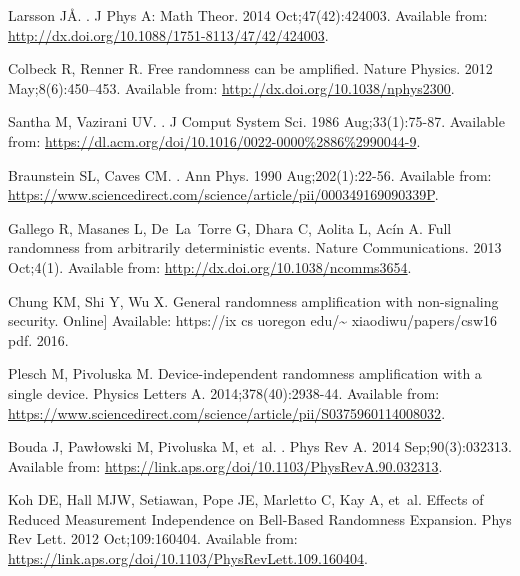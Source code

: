 \documentclass[]{interact}
\theoremstyle{plain}%
\theoremstyle{definition}
\theoremstyle{remark}
\begin{document}
\begin{thebibliography}{100}
Larsson J{\AA}.
.
\newblock J Phys A: Math Theor. 2014 Oct;47(42):424003.
\newblock Available from:
  \url{http://dx.doi.org/10.1088/1751-8113/47/42/424003}.

Colbeck R, Renner R.
\newblock Free randomness can be amplified.
\newblock Nature Physics. 2012 May;8(6):450–453.
\newblock Available from: \url{http://dx.doi.org/10.1038/nphys2300}.

Santha M, Vazirani UV.
.
\newblock J Comput System Sci. 1986 Aug;33(1):75-87.
\newblock Available from:
  \url{https://dl.acm.org/doi/10.1016/0022-0000%2886%2990044-9}.

Braunstein SL, Caves CM.
.
\newblock Ann Phys. 1990 Aug;202(1):22-56.
\newblock Available from:
  \url{https://www.sciencedirect.com/science/article/pii/000349169090339P}.

Gallego R, Masanes L, De~La~Torre G, Dhara C, Aolita L, Acín A.
\newblock Full randomness from arbitrarily deterministic events.
\newblock Nature Communications. 2013 Oct;4(1).
\newblock Available from: \url{http://dx.doi.org/10.1038/ncomms3654}.

Chung KM, Shi Y, Wu X.
\newblock General randomness amplification with non-signaling security.
\newblock Online] Available: https://ix cs uoregon edu/\~{}
  xiaodiwu/papers/csw16 pdf. 2016.

Plesch M, Pivoluska M.
\newblock Device-independent randomness amplification with a single device.
\newblock Physics Letters A. 2014;378(40):2938-44.
\newblock Available from:
  \url{https://www.sciencedirect.com/science/article/pii/S0375960114008032}.

Bouda J, Paw{\l}owski M, Pivoluska M, et~al.
.
\newblock Phys Rev A. 2014 Sep;90(3):032313.
\newblock Available from:
  \url{https://link.aps.org/doi/10.1103/PhysRevA.90.032313}.

Koh DE, Hall MJW, Setiawan, Pope JE, Marletto C, Kay A, et~al.
\newblock Effects of Reduced Measurement Independence on Bell-Based Randomness
  Expansion.
\newblock Phys Rev Lett. 2012 Oct;109:160404.
\newblock Available from:
  \url{https://link.aps.org/doi/10.1103/PhysRevLett.109.160404}.


\end{thebibliography}
\end{document}
